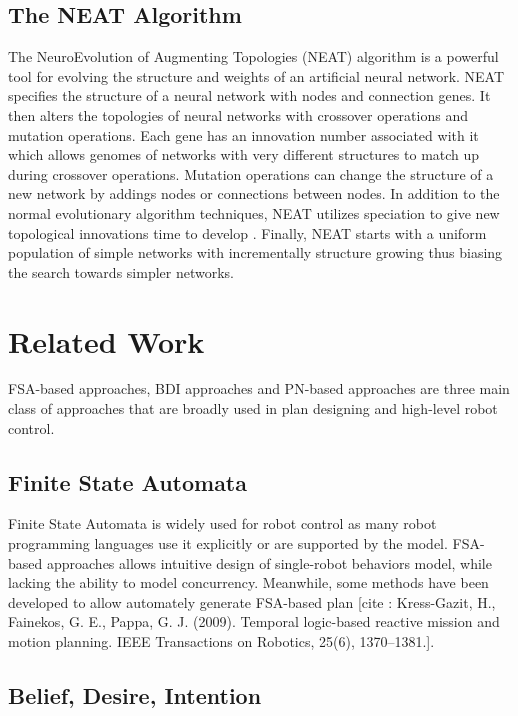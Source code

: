 \documentclass[12pt,a4paper,twocolumn]{article}
\begin{document}
\subsection{The NEAT Algorithm}

The NeuroEvolution of Augmenting Topologies (NEAT) algorithm is a powerful tool for evolving the structure and weights of an artificial neural network. NEAT specifies the structure of a neural network with nodes and connection genes. It then alters the topologies of neural networks with crossover operations and mutation operations. Each gene has an innovation number associated with it which allows genomes of networks with very different structures to match up during crossover operations. Mutation operations can change the structure of a new network by addings nodes or connections between nodes. In addition to the normal evolutionary algorithm techniques, NEAT utilizes speciation to give new topological innovations time to develop \cite{neat}. Finally, NEAT starts with a uniform population of simple networks with incrementally structure growing thus biasing the search towards simpler networks.

\section{Related Work}
FSA-based approaches, BDI approaches and PN-based approaches are three main class of approaches that are broadly used in plan designing and high-level robot control.

\subsection{Finite State Automata}

Finite State Automata is widely used for robot control as many robot programming languages use it explicitly or are supported by the model. FSA-based approaches allows intuitive design of single-robot behaviors model, while lacking the ability to model concurrency. Meanwhile, some methods have been developed to allow automately generate FSA-based plan [cite : Kress-Gazit, H., Fainekos, G. E., Pappa, G. J. (2009). Temporal logic-based reactive mission and motion planning. IEEE Transactions on Robotics, 25(6), 1370–1381.].  

\subsection{Belief, Desire, Intention}
\end{document}
